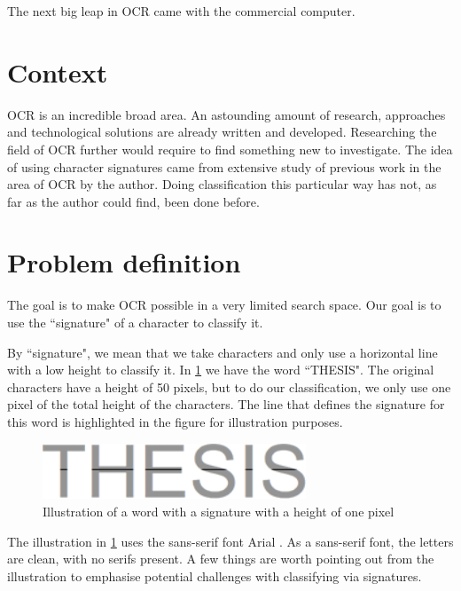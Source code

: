 The next big leap in OCR came with the commercial computer. 


\section{Context}
OCR is an incredible broad area. An astounding amount of research, approaches and technological solutions are already written and developed. Researching the field of OCR further would require to find something new to investigate. The idea of using character signatures came from extensive study of previous work in the area of OCR by the author. Doing classification this particular way has not, as far as the author could find, been done before. 

\section{Problem definition}
The goal is to make OCR possible in a very limited search space. Our goal is to use the ``signature" of a character to classify it.

By ``signature", we mean that we take characters and only use a horizontal line with a low height to classify it. In \ref{fig:thesis-signature} we have the word ``THESIS". The original characters have a height of 50 pixels, but to do our classification, we only use one pixel of the total height of the characters. The line that defines the signature for this word is highlighted in the figure for illustration purposes.

\begin{figure}[ht]
    \centering
    \includegraphics[width=0.7\textwidth]{fig/chapter1/signature.png}
    \caption{Illustration of a word with a signature with a height of one pixel}
    \label{fig:thesis-signature}
\end{figure}

 The illustration in \ref{fig:thesis-signature} uses the sans-serif font Arial \cite{misc-arial-font}. As a \gls{sans-serif} font, the letters are clean, with no \gls{serif}s present. A few things are worth pointing out from the illustration to emphasise potential challenges with classifying via signatures.

